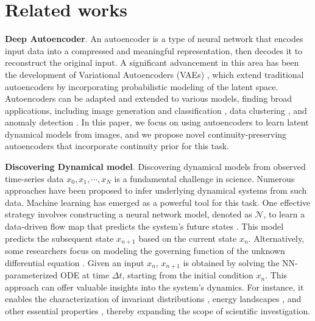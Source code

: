 \section{Related works}
\textbf{Deep Autoencoder}.
An autoencoder \citep{baldi2012autoencoders, ranzato2007unsupervised, rumelhart1986learning} is a type of neural network that encodes input data into a compressed and meaningful representation, then decodes it to reconstruct the original input. A significant advancement in this area has been the development of Variational Autoencoders (VAEs) \citep{kingma2014auto}, which extend traditional autoencoders by incorporating probabilistic modeling of the latent space. Autoencoders can be adapted and extended to various models, finding broad applications, including image generation and classification \citep{kingma2014auto, yunchen2016variational}, data clustering \citep{guo2017deep, song2013auto}, and anomaly detection \citep{gong2019memorizing, zong2018deep}. In this paper, we focus on using autoencoders to learn latent dynamical models from images, and we propose novel continuity-preserving autoencoders that incorporate continuity prior for this task.

\textbf{Discovering Dynamical model}.
Discovering dynamical models from observed time-series data ${x_0, x_1,\cdots, x_N}$ is a fundamental challenge in science. Numerous approaches have been proposed to infer underlying dynamical systems from such data. Machine learning has emerged as a powerful tool for this task. One effective strategy involves constructing a neural network model, denoted as $\mathcal{N}$, to learn a data-driven flow map that predicts the system's future states \citep{chen2022automated, chen2024learning, wang2021bridging,wu2020data}. This model predicts the subsequent state $x_{n+1}$ based on the current state $x_n$. Alternatively, some researchers focus on modeling the governing function of the unknown differential equation \citep{chen2018neural, gonzalez1998identification, raissi2018multistep}. Given an input $x_n$, $x_{n+1}$ is obtained by solving the NN-parameterized ODE at time $\Delta t$, starting from the initial condition $x_n$.  This approach can offer valuable insights into the system's dynamics. For instance, it enables the characterization of invariant distributions \citep{gu2023stationary, lin2023computing}, energy landscapes \citep{chen2023constructing}, and other essential properties \citep{qiu2022mapping}, thereby expanding the scope of scientific investigation.

